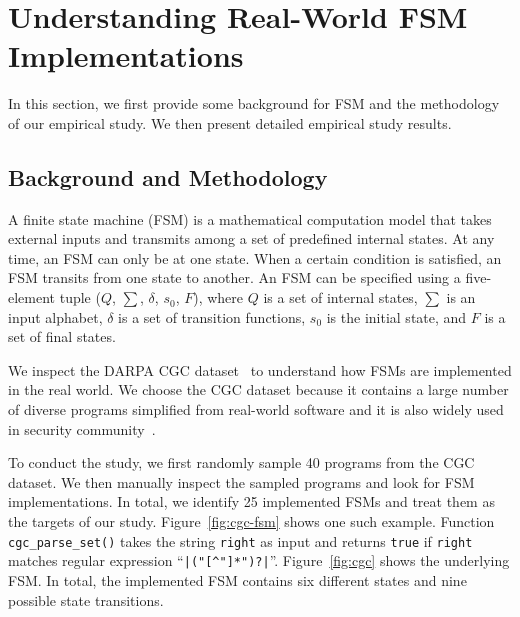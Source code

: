 \section{Understanding Real-World FSM Implementations}
\label{sec:study}


In this section, we first provide some background 
for FSM and the methodology of our empirical study. 
We then present detailed empirical study results. 



\subsection{Background and Methodology}






A finite state machine (FSM) is a mathematical computation model
that takes external inputs and transmits among a set of predefined internal states. 
At any time, an FSM can only be at one state.
When a certain condition is satisfied,
an FSM transits from one state to another.
An FSM can be specified using a five-element tuple ($Q$, $\sum$, $\delta$, $s_0$, $F$),
where $Q$ is a set of internal states, $\sum$ is an input alphabet,
$\delta$ is a set of transition functions,
$s_0$ is the initial state, and $F$ is 
a set of final states.

We inspect the DARPA CGC dataset~\cite{CGC} to
understand how FSMs are implemented in the real world.
We choose the CGC dataset because it
contains a large number of diverse programs simplified
from real-world software and it
is also widely used in security
community~\cite{QSYM, Driller, VUzzer}.






To conduct the study, we first randomly sample
40 programs from the CGC dataset.
We then manually inspect the sampled programs and look for 
FSM implementations.
In total, we identify 25 implemented FSMs
and treat them as the targets of our study.
Figure~\ref{fig:cgc-fsm} shows one such example.
Function \texttt{cgc\_parse\_set()} takes the string \texttt{right}
as input and returns \texttt{true} if \texttt{right} matches
regular expression ``\verb/|("[^"]*")?|/''.
Figure~\ref{fig:cgc} shows the underlying FSM.
In total, the implemented FSM contains six different states
and nine possible state transitions.



